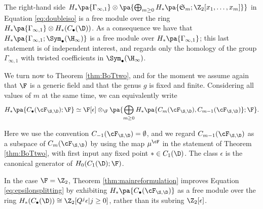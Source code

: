 The right-hand side $H_*\pa{\Gamma_{\infty,1}}\otimes \pa{\bigoplus_{m\geq 0} H_*\pa{\mathfrak{S}_m;\Z_2[x_1,\dots,x_m]}}$
in Equation \ref{eq:doubleiso} is a free module over the ring $H_*\pa{\Gamma_{\infty,1}}\otimes H_*(C_{\bullet}(\D))$.
As a consequence we have that $H_*\pa{\Gamma_{\infty,1};\Sym_{\bullet}(\H_{\infty})}$ is a free module
over $H_*\pa{\Gamma_{\infty,1}}$; this last statement is of independent interest, and regards only the homology
of the group $\Gamma_{\infty,1}$ with twisted coefficients in $\Sym_{\bullet}(\H_{\infty})$.


We turn now to Theorem \ref{thm:BoTtwo}, and for the moment we assume again that $\F$ is a generic field and that the genus $g$
is fixed and finite. Considering
all values of $m$ at the same time, we can equivalently write
\begin{equation}
\label{eq:epsilonsplitting}
 H_*\pa{C_{\bullet}(\cF_{\S,\D});\F}\simeq \F[\epsilon]\otimes_{\F}\pa{\bigoplus_{m\geq 0} H_*\pa{C_m(\cF_{\S,\D}),C_{m-1}(\cF_{\S,\D})};\F}.
 \end{equation}

Here we use the convention $C_{-1}(\cF_{\S,\D})=\emptyset$, and we regard $C_{m-1}(\cF_{\S,\D})$ as a subspace of $C_m(\cF_{\S,\D})$ by using the map
$\mu^{\cF}$ in the statement of Theorem \ref{thm:BoTtwo}, with first input any fixed point $*\in C_1(\D)$. The class
$\epsilon$ is the canonical generator of $H_0(C_1(\D);\F)$.

In the case $\F=\Z_2$, Theorem \ref{thm:mainreformulation} improves Equation \ref{eq:epsilonsplitting} by exhibiting
$ H_*\pa{C_{\bullet}(\cF_{\S,\D})}$ as a free module over the ring $H_*(C_{\bullet}(\D))\cong\Z_2[Q^j\epsilon|j\geq 0]$,
rather than its subring $\Z_2[\epsilon]$.